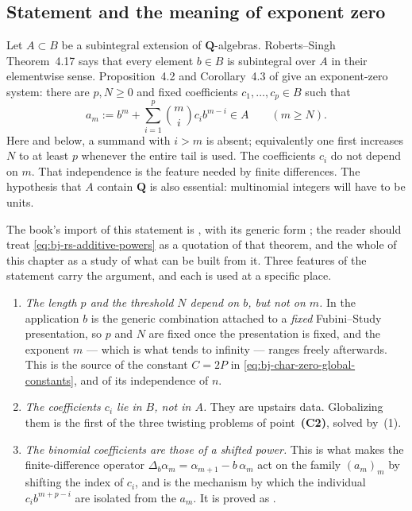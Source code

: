 \subsection{Statement and the meaning of exponent zero}
\label{sec:ch44-rs-statement}

Let $A\subset B$ be a subintegral extension of $\mathbf Q$-algebras.
Roberts--Singh Theorem~4.17 says that every element $b\in B$ is
subintegral over $A$ in their elementwise sense.
Proposition~4.2 and Corollary~4.3 of \cite{RobertsSingh} give an
exponent-zero system:
there are $p,N\ge0$ and fixed coefficients
$c_1,\ldots,c_p\in B$ such that
\[
 a_m:=b^m+\sum_{i=1}^p\binom mi c_i b^{m-i}\in A
                         \qquad(m\ge N).
\tag{44.3}\label{eq:bj-rs-additive-powers}
\]
Here and below, a summand with $i>m$ is absent; equivalently one first
increases $N$ to at least $p$ whenever the entire tail is used.
The coefficients $c_i$ do not depend on $m$.
That independence is the feature needed by finite differences.
The hypothesis that $A$ contain $\mathbf Q$ is also essential:
multinomial integers will have to be units.

The book's import of this statement is , with
its generic form ; the reader should treat
\eqref{eq:bj-rs-additive-powers} as a quotation of that theorem, and the
whole of this chapter as a study of what can be built from it.  Three
features of the statement carry the argument, and each is used at a
specific place.

\begin{enumerate}
\item \emph{The length $p$ and the threshold $N$ depend on $b$, but
      not on $m$.}  In the application $b$ is the generic combination
      attached to a \emph{fixed} Fubini--Study presentation, so $p$ and
      $N$ are fixed once the presentation is fixed, and the exponent
      $m$ --- which is what tends to infinity --- ranges freely
      afterwards.  This is the source of the constant $C=2P$ in
      \eqref{eq:bj-char-zero-global-constants}, and of its independence
      of $n$.
\item \emph{The coefficients $c_i$ lie in $B$, not in $A$.}  They are
      upstairs data.  Globalizing them is the first of the three twisting
      problems of point~\textbf{(C2)}, solved by
      \,(1).
\item \emph{The binomial coefficients are those of a shifted power.}  This
      is what makes the finite-difference operator
      $\Delta_b\alpha_m=\alpha_{m+1}-b\,\alpha_m$ act on the family
      $(a_m)_m$ by shifting the index of $c_i$, and is the mechanism by
      which the individual $c_ib^{m+p-i}$ are isolated from the $a_m$.
      It is proved as .
\end{enumerate}

